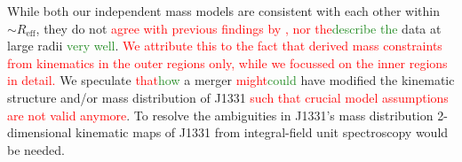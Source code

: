 \documentclass[useAMS,usenatbib]{mnras}
\newcommand{\NEW}[1]{\textcolor{ForestGreen}{#1}}
\newcommand{\OLD}[1]{\textcolor{Red}{#1}}
\begin{document}
While both our independent mass models are consistent with each other within $\sim R_\text{eff}$, they do not \OLD{agree with previous findings by \citet{SWELLSV}, nor the}\NEW{describe the} data at large radii \NEW{very well}. \OLD{We attribute this to the fact that \citet{SWELLSV} derived mass constraints from kinematics in the outer regions only, while we focussed on the inner regions in detail.} We speculate \OLD{that}\NEW{how} a merger \OLD{might}\NEW{could} have modified the kinematic structure and/or mass distribution of J1331\OLD{ such that crucial model assumptions are not valid anymore}. To resolve the ambiguities in J1331's mass distribution 2-dimensional kinematic maps of J1331 from integral-field unit spectroscopy would be needed.




\label{lastpage}
\end{document}
